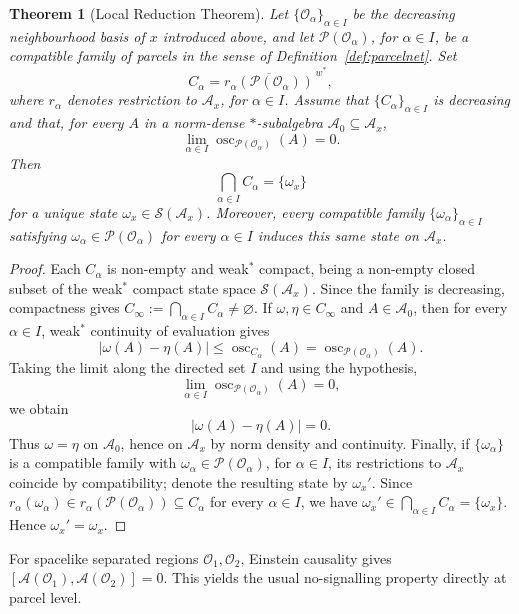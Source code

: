 \documentclass[11pt]{article}
\newtheorem{theorem}{Theorem}[section]
\newcommand{\A}{\mathcal{A}}
\begin{document}
\begin{theorem}[Local Reduction Theorem]
\label{thm:localreduction}
Let $\{\mathcal O_\alpha\}_{\alpha\in I}$ be the decreasing neighbourhood
basis of $x$ introduced above, and let
$\mathcal P(\mathcal O_\alpha)$, for $\alpha\in I$,  be a compatible family of parcels in the
sense of Definition~\ref{def:parcelnet}. Set
\[
C_\alpha
=
\overline{
r_\alpha(\mathcal P(\mathcal O_\alpha))
}^{\,w^*},
\]
where $r_\alpha$ denotes restriction to $\A_x$, for $\alpha\in I$. Assume that $\{C_\alpha\}_{\alpha\in I}$ is decreasing and that, for
every $A$ in a norm-dense $*$-subalgebra
$\A_0\subseteq\A_x$,
\[
\lim_{\alpha\in I}
\operatorname{osc}_{\mathcal P(\mathcal O_\alpha)}(A)
=
0.
\]
Then
\[
\bigcap_{\alpha\in I} C_\alpha=\{\omega_x\}
\]
for a unique state $\omega_x\in\mathcal S(\A_x)$. Moreover, every compatible family
$\{\omega_\alpha\}_{\alpha\in I}$ satisfying
$\omega_\alpha\in\mathcal P(\mathcal O_\alpha)$ for every
$\alpha\in I$ induces this same state on $\A_x$.

\end{theorem}

\begin{proof}
Each $C_\alpha$ is non-empty and weak$^*$ compact, being a non-empty
closed subset of the weak$^*$ compact state space $\mathcal S(\A_x)$.
Since the family is decreasing, compactness gives
$C_\infty
:=
\bigcap_{\alpha\in I}C_\alpha
\neq\varnothing$. If $\omega,\eta\in C_\infty$ and $A\in\A_0$, then for every
$\alpha\in I$, weak$^*$ continuity of evaluation gives
\[
|\omega(A)-\eta(A)|
\leq
\operatorname{osc}_{C_\alpha}(A)
=
\operatorname{osc}_{\mathcal P(\mathcal O_\alpha)}(A).
\]
Taking the limit along the directed set $I$ and using the hypothesis,
\[
\lim_{\alpha\in I}
\operatorname{osc}_{\mathcal P(\mathcal O_\alpha)}(A)
=
0,
\]
we obtain
\[
|\omega(A)-\eta(A)|=0.
\]
Thus $\omega=\eta$ on $\A_0$, hence on $\A_x$ by norm density and
continuity. Finally, if
$\{\omega_\alpha\}$ is a compatible family with
$\omega_\alpha\in\mathcal P(\mathcal O_\alpha)$, for $\alpha\in I$, its restrictions to
$\A_x$ coincide by compatibility; denote the resulting state by
$\omega_x'$. Since
$r_\alpha(\omega_\alpha)\in
r_\alpha(\mathcal P(\mathcal O_\alpha))\subseteq C_\alpha$
for every $\alpha\in I$, we have
$\omega_x'\in
\bigcap_{\alpha\in I}C_\alpha=\{\omega_x\}$.
Hence $\omega_x'=\omega_x$.
\end{proof}

For spacelike separated regions $\mathcal O_1,\mathcal O_2$, Einstein
causality gives
$[\A(\mathcal O_1),\A(\mathcal O_2)]=0$. This yields the usual
no-signalling property directly at parcel level.
\end{document}
